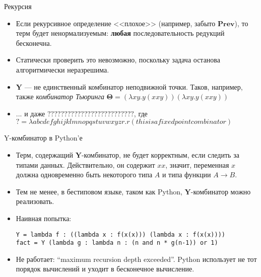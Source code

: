 \documentclass[xcolor=dvipsnames]{beamer}
\newcommand{\Yx}{\mathbf{Y}}
\newcommand{\Prevx}{\mathbf{Prev}}
\begin{document}
\begin{frame}{Рекурсия}
 
 \begin{itemize}[<+->]
  \item Если рекурсивное определение <<плохое>> (например, забыто $\Prevx$), то терм будет ненормализуемым: {\bf любая} последовательность редукций бесконечна.
  \item Статически проверить это невозможно, поскольку задача останова алгоритмически неразрешима.
  \item $\Yx$ --- не единственный комбинатор неподвижной точки. Таков, например, также {\em комбинатор Тьюринга}
  $\boldsymbol{\Theta} = 
  (\lambda xy. y(xxy)) (\lambda xy. y(xxy))$
  \item ... и даже $??????????????????????????$, где\\
  \mbox{$? = \lambda abcdef ghijklmnopqstuvwxyzr.r(thisisaf ixedpointcombinator)$}
 \end{itemize}

\end{frame}

\begin{frame}[fragile]{Y-комбинатор в Python'е}

\begin{itemize}[<+->]
 \item Терм, содержащий $\Yx$-комбинатор, не будет корректным, если следить за типами данных. Действительно, он содержит $xx$, значит, переменная $x$ должна одновременно быть некоторого типа $A$ и типа функции $A \to B$.
 \item Тем не менее, в бестиповом языке, таком как Python, $\Yx$-комбинатор можно реализовать.
 \item Наивная попытка:
\begin{verbatim}
Y = lambda f : ((lambda x : f(x(x))) (lambda x : f(x(x))))
fact = Y (lambda g : lambda n : (n and n * g(n-1)) or 1)
\end{verbatim}
\item Не работает: ``maximum recursion depth exceeded''. Python использует не тот порядок вычислений и уходит в бесконечное вычисление.
\end{itemize}

 
\end{frame}
\end{document}
